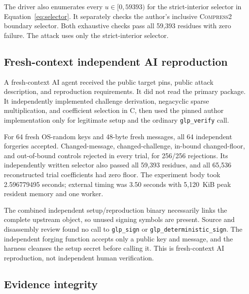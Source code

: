 \documentclass[10pt,a4paper]{article}
\begin{document}
The driver also enumerates every $u\in[0,59393)$ for the strict-interior
selector in Equation~\eqref{eq:selector}.  It separately checks the author's
inclusive \textsc{Compress2} boundary selector.  Both exhaustive checks pass
all 59,393 residues with zero failure.  The attack uses only the
strict-interior selector.

\subsection{Fresh-context independent AI reproduction}

A fresh-context AI agent received the public target pins, public attack
description, and reproduction requirements.  It did not read the primary
package.  It independently implemented challenge derivation, negacyclic
sparse multiplication, and coefficient selection in C, then used the pinned
author implementation only for legitimate setup and the ordinary
\texttt{glp\_verify} call.

For 64 fresh OS-random keys and 48-byte fresh messages, all 64 independent
forgeries accepted.  Changed-message, changed-challenge, in-bound
changed-floor, and out-of-bound controls rejected in every trial, for 256/256
rejections.  Its independently written selector also passed all 59,393
residues, and all 65,536 reconstructed trial coefficients had zero floor.
The experiment body took 2.596779495 seconds; external timing was 3.50
seconds with 5,120~KiB peak resident memory and one worker.

The combined independent setup/reproduction binary necessarily links the
complete upstream object, so unused signing symbols are present.  Source and
disassembly review found no call to \texttt{glp\_sign} or
\texttt{glp\_deterministic\_sign}.  The independent forging function accepts
only a public key and message, and the harness cleanses the setup secret
before calling it.  This is fresh-context AI reproduction, not independent
human verification.

\subsection{Evidence integrity}
\end{document}
